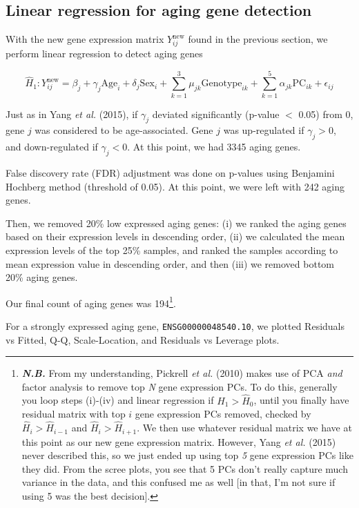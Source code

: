 \documentclass[11pt, oneside]{article}   	%
\begin{document}
\subsection*{Linear regression for aging gene detection}

With the new gene expression matrix $ Y_{ij}^{\text{new}} $ found in the previous section, we perform linear regression to detect aging genes

$$ \hat{H}_1: Y_{ij}^{\text{new}} = \beta_{j} + \gamma_{j} \text{Age}_{i} + \delta_{j} \text{Sex}_{i} + \sum_{k=1}^{3} \mu_{jk} \text{Genotype}_{ik} + \sum_{k=1}^{5} \alpha_{jk} \text{PC}_{ik} + \epsilon_{ij} $$

Just as in Yang \emph{et al.} (2015), if $ \gamma_{j} $ deviated significantly (p-value $<$ 0.05) from 0, gene $ j $ was considered to be age-associated. Gene $ j $ was up-regulated if $ \gamma_{j} > 0 $, and down-regulated if $ \gamma_{j} < 0 $. At this point, we had 3345 aging genes.

False discovery rate (FDR) adjustment was done on p-values using Benjamini Hochberg method (threshold of 0.05). At this point, we were left with 242 aging genes.

Then, we removed 20\% low expressed aging genes: (i) we ranked the aging genes based on their expression levels in descending order, (ii) we calculated the mean expression levels of the top 25\% samples, and ranked the samples according to mean expression value in descending order, and then (iii) we removed bottom 20\% aging genes.

Our final count of aging genes was 194\footnote{\emph{\textbf{N.B.}} From my understanding, Pickrell \emph{et al.} (2010) makes use of PCA \emph{and} factor analysis to remove top \emph{N} gene expression PCs. To do this, generally you loop steps (i)-(iv) and linear regression if $\hat{H}_1 > \hat{H}_0$, until you finally have residual matrix with top $i$ gene expression PCs removed, checked by $\hat{H}_i > \hat{H}_{i-1}$ and $\hat{H}_i > \hat{H}_{i+1}$. We then use whatever residual matrix we have at this point as our new gene expression matrix. However, Yang \emph{et al.} (2015) never described this, so we just ended up using top \emph{5} gene expression PCs like they did. From the scree plots, you see that 5 PCs don't really capture much variance in the data, and this confused me as well [in that, I'm not sure if using 5 was the best decision].}.

For a strongly expressed aging gene, \texttt{ENSG00000048540.10}, we plotted Residuals vs Fitted, Q-Q, Scale-Location, and Residuals vs Leverage plots.
\end{document}
